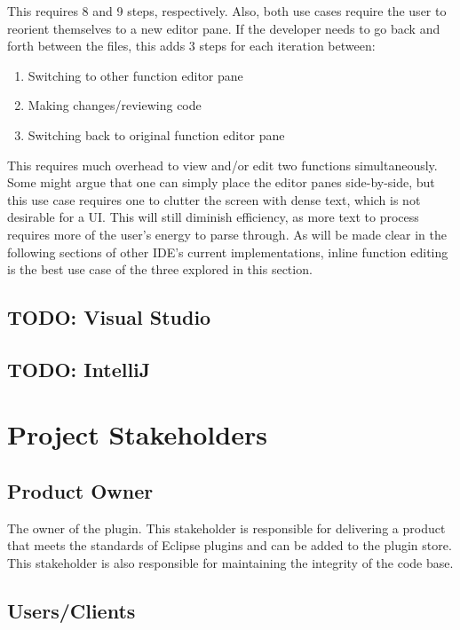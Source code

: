 \documentclass[]{report}
\begin{document}
This requires 8 and 9 steps, respectively.  Also, both use cases require the user to reorient themselves to a new editor pane.  If the developer needs to go back and forth between the files, this adds 3 steps for each iteration between:

	\begin{enumerate}
		\item
		Switching to other function editor pane
		
		\item
		Making changes/reviewing code
		
		\item 
		Switching back to original function editor pane
	\end{enumerate}

This requires much overhead to view and/or edit two functions simultaneously.  Some might argue that one can simply place the editor panes side-by-side, but this use case requires one to clutter the screen with dense text, which is not desirable for a UI.  This will still diminish efficiency, as more text to process requires more of the user's energy to parse through.  As will be made clear in the following sections of other IDE's current implementations, inline function editing is the best use case of the three explored in this section.

\section{TODO: Visual Studio}

\section{TODO: IntelliJ}

\chapter{Project Stakeholders}

\section{Product Owner}

The owner of the plugin.  This stakeholder is responsible for delivering a product that meets the standards of Eclipse plugins and can be added to the plugin store.  This stakeholder is also responsible for maintaining the integrity of the code base.

\section{Users/Clients}
\end{document}
